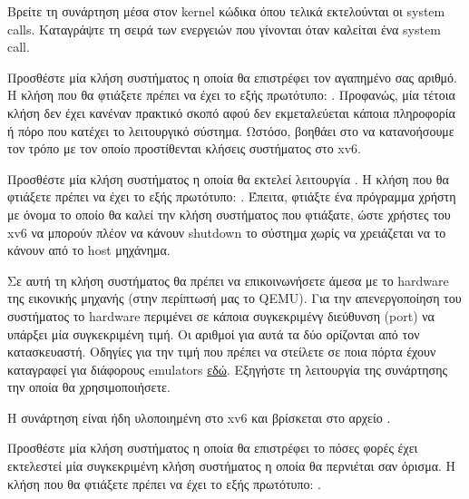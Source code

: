 \documentclass[18pt]{extarticle}
\begin{document}
\begin{question}
    Βρείτε τη συνάρτηση μέσα στον kernel κώδικα όπου τελικά εκτελούνται οι system calls.
    Καταγράψτε τη σειρά των ενεργειών που γίνονται όταν καλείται ένα system call.
\end{question}

\begin{question}
    Προσθέστε μία κλήση συστήματος η οποία θα επιστρέφει τον αγαπημένο σας αριθμό.
    Η κλήση που θα φτιάξετε πρέπει να έχει το εξής πρωτότυπο: .
    Προφανώς, μία τέτοια κλήση δεν έχει κανέναν πρακτικό σκοπό αφού δεν εκμεταλεύεται κάποια πληροφορία ή 
    πόρο που κατέχει το λειτουργικό σύστημα. Ωστόσο, βοηθάει στο να κατανοήσουμε τον τρόπο με τον οποίο
    προστίθενται κλήσεις συστήματος στο xv6.
\end{question}

\begin{question}
    Προσθέστε μία κλήση συστήματος η οποία θα εκτελεί λειτουργία . 
    Η κλήση που θα φτιάξετε πρέπει να έχει το εξής πρωτότυπο: .
    Έπειτα, φτιάξτε ένα πρόγραμμα χρήστη με όνομα  το οποίο θα καλεί την κλήση συστήματος που φτιάξατε, ώστε 
    χρήστες του xv6 να μπορούν πλέον να κάνουν shutdown το σύστημα χωρίς να χρειάζεται να το κάνουν από το host μηχάνημα.

    Σε αυτή τη κλήση συστήματος θα πρέπει να επικοινωνήσετε άμεσα με το hardware της εικονικής μηχανής (στην περίπτωσή μας το QEMU).
    Για την απενεργοποίηση του συστήματος το hardware περιμένει σε κάποια συγκεκριμένγ διεύθυνση (port) να υπάρξει μία συγκεκριμένη 
    τιμή. Οι αριθμοί για αυτά τα δύο ορίζονται από τον κατασκευαστή.
    Οδηγίες για την τιμή που πρέπει να στείλετε σε ποια πόρτα έχουν καταγραφεί για διάφορους emulators \href{https://wiki.osdev.org/Shutdown}{εδώ}.
    Εξηγήστε τη λειτουργία της συνάρτησης  την οποία θα χρησιμοποιήσετε.

    \begin{info}[Σημείωση:]
        Η συνάρτηση  είναι ήδη υλοποιημένη στο xv6 και βρίσκεται στο αρχείο .
    \end{info}
\end{question}

\begin{question}
    Προσθέστε μία κλήση συστήματος η οποία θα επιστρέφει το πόσες φορές έχει εκτελεστεί μία 
    συγκεκριμένη κλήση συστήματος η οποία θα περνιέται σαν όρισμα.
    Η κλήση που θα φτιάξετε πρέπει να έχει το εξής πρωτότυπο: .
\end{question}
\end{document}
